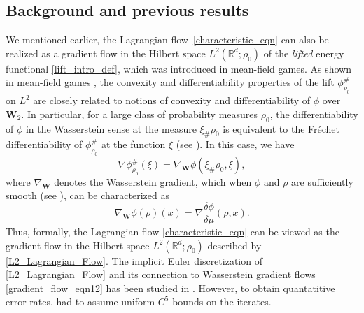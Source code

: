 \documentclass[11pt,a4paper]{amsart}
\newcommand{\1}{\mathds{1}}
\newcommand{\R}{{\mathbb R}}
\numberwithin{equation}{section}
\begin{document}
\subsection{Background and previous results}
We mentioned earlier, the Lagrangian flow~\eqref{characteristic_eqn} can also be realized as a gradient flow in the Hilbert space $L^2(\mathbb{R}^d;\rho_0)$ of the \textit{lifted} energy functional \eqref{lift_intro_def}, which was introduced in mean-field games. 
As shown in mean-field games \cite{gangbo2019differentiability,gangbo2022global,carmona2018probabilistic,cardaliaguet2019master}, the convexity and differentiability properties of the lift $\phi^{\#}_{\rho_0}$ on $L^2$ are closely related to notions of convexity and differentiability of $\phi$ over $\mathbf{W}_2$. In particular, for a large class of probability measures $\rho_0$, the differentiability of $\phi$ in the Wasserstein sense at the measure $\xi_{\#} \rho_0$ is equivalent to the Fréchet differentiability of $\phi^{\#}_{\rho_0}$ at the function $\xi$ (see \cite[Corollary 3.22]{gangbo2019differentiability}). In this case, we have
\[
\nabla \phi^{\#}_{\rho_0}(\xi) = \nabla_{\mathbf{W}} \phi(\xi_{\#} \rho_0,\xi),
\]
where $\nabla_{\mathbf{W}}$ denotes the Wasserstein gradient, %
which  when $\phi$ and $\rho$ are sufficiently smooth (see \cite[Lemma 4.12]{ambrosio2007gradient}), can be characterized as
\[
\nabla_{\mathbf{W}} \phi(\rho)(x) = \nabla \frac{\delta \phi}{\delta \mu} (\rho,x).
\]
Thus, formally, the Lagrangian flow \eqref{characteristic_eqn} can be viewed as the gradient flow in the Hilbert space $L^2(\R^d;\rho_0)$ described by \eqref{L2_Lagrangian_Flow}. The implicit Euler discretization of \eqref{L2_Lagrangian_Flow} and its connection to Wasserstein gradient flows \eqref{gradient_flow_eqn12} has been studied in
\cite{junge2017fully,carrillo2021lagrangian,evans2005diffeomorphisms,ambrosio2006stability}. However, to obtain quantatitive error rates, \cite{junge2017fully} had to assume uniform $C^5$ bounds on the iterates.
\end{document}
